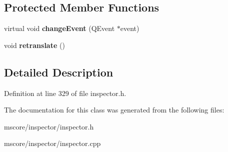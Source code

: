 \subsection*{Protected Member Functions}
\begin{DoxyCompactItemize}
\item 
\mbox{\label{class_ms_1_1_inspector_a42d2a1009ce1b8f594db67a0a30e4de5}} 
virtual void {\bfseries change\+Event} (Q\+Event $\ast$event)
\item 
\mbox{\label{class_ms_1_1_inspector_a0c7637add778e808b56df70b0644fbaa}} 
void {\bfseries retranslate} ()
\end{DoxyCompactItemize}


\subsection{Detailed Description}


Definition at line 329 of file inspector.\+h.



The documentation for this class was generated from the following files\+:\begin{DoxyCompactItemize}
\item 
mscore/inspector/inspector.\+h\item 
mscore/inspector/inspector.\+cpp\end{DoxyCompactItemize}
